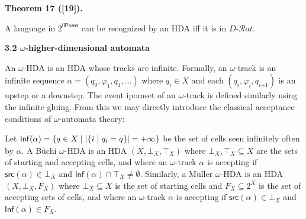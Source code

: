 \documentclass[10pt,a4paper]{article}
\begin{document}
 
 
\par\medskip\noindent\textbf{Theorem 17 ([19]).}\par
 
 
A language in $2^{\mathsf{iiPoms}}$ can be recognized by an HDA iff it is in $D\text{-}\mathcal{R}at$.\par
 
 
 
 
 
\par\medskip\noindent\textbf{3.2 $\omega$-higher-dimensional automata}\par
 
 
An $\omega$-HDA is an HDA whose tracks are infinite. Formally, an $\omega$-track is an infinite sequence $\alpha=(q_{0},\varphi_{1},q_{1},\dots)$ where $q_{i}\in X$ and each $(q_{i},\varphi_{i},q_{i\text{+}1})$ is an upstep or a downstep. The event ipomset of an $\omega$-track is defined similarly using the infinite gluing. From this we may directly introduce the classical acceptance conditions of $\omega$-automata theory:\par
 
 
 
Let $\mathsf{Inf}(\alpha)={\{q\in X\mid|\{i\mathrel{\big{|}}q_{i}=q\}|=+\infty\}}$ be the set of cells seen infinitely often by $\alpha$. A Büchi $\omega$-HDA is an HDA $(X,\bot_{X},\top_{X})$ where $\bot_{X},\top_{X}\subseteq X$ are the sets of starting and accepting cells, and where an $\omega$-track $\alpha$ is accepting if $\mathsf{src}(\alpha)\in\bot_{X}$ and $\mathsf{Inf}(\alpha)\cap\top_{X}\neq\emptyset$. Similarly, a Muller $\omega$-HDA is an HDA $(X,\bot_{X},F_{X})$ where $\bot_{X}\subseteq X$ is the set of starting cells and $F_{X}\subseteq 2^{X}$ is the set of accepting sets of cells, and where an $\omega$-track $\alpha$ is accepting if $\mathsf{src}(\alpha)\in\bot_{X}$ and $\mathsf{Inf}(\alpha)\in F_{X}$.\par
 
 
 
\end{document}
